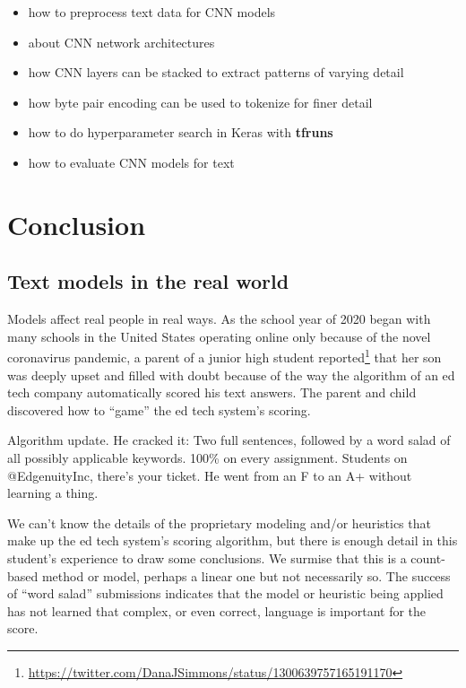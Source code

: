 \documentclass[
]{krantz}
\DeclareRobustCommand{\href}[2]{#2\footnote{\url{#1}}}
\renewenvironment{quote}{\begin{VF}}{\end{VF}}
\renewcommand{\href}[2]{#2\footnote{\url{#1}}}
\begin{document}
\begin{itemize}
\item
  how to preprocess text data for CNN models
\item
  about CNN network architectures
\item
  how CNN layers can be stacked to extract patterns of varying detail
\item
  how byte pair encoding can be used to tokenize for finer detail
\item
  how to do hyperparameter search in Keras with \textbf{tfruns}
\item
  how to evaluate CNN models for text
\end{itemize}

\cleardoublepage

\hypertarget{part-conclusion}{%
\part{Conclusion}\label{part-conclusion}}

\hypertarget{text-models-in-the-real-world}{%
\chapter*{Text models in the real world}\label{text-models-in-the-real-world}}


Models affect real people in real ways. As the school year of 2020 began with many schools in the United States operating online only because of the novel coronavirus pandemic, a parent of a junior high student \href{https://twitter.com/DanaJSimmons/status/1300639757165191170}{reported} that her son was deeply upset and filled with doubt because of the way the algorithm of an ed tech company automatically scored his text answers. The parent and child discovered \citep{Verge2020} how to ``game'' the ed tech system's scoring.

\begin{quote}
Algorithm update. He cracked it: Two full sentences, followed by a word salad of all possibly applicable keywords. 100\% on every assignment. Students on @EdgenuityInc, there's your ticket. He went from an F to an A+ without learning a thing.
\end{quote}

We can't know the details of the proprietary modeling and/or heuristics that make up the ed tech system's scoring algorithm, but there is enough detail in this student's experience to draw some conclusions. We surmise that this is a count-based method or model, perhaps a linear one but not necessarily so. The success of ``word salad'' submissions indicates that the model or heuristic being applied has not learned that complex, or even correct, language is important for the score.
\end{document}
